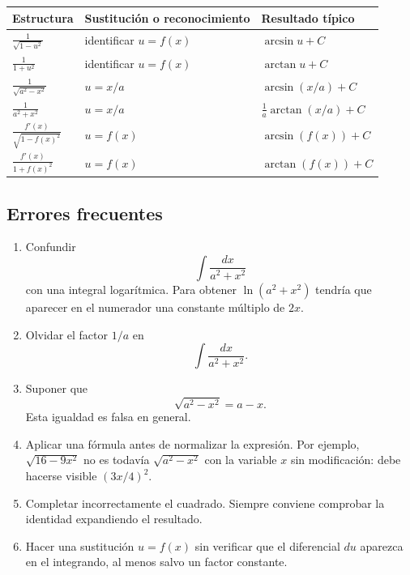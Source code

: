 \begin{center}
\renewcommand{\arraystretch}{1.6}
\begin{tabular}{>{\centering\arraybackslash}p{}
                >{\centering\arraybackslash}p{}
                >{\centering\arraybackslash}p{}}
\toprule
\textbf{Estructura} & \textbf{Sustitución o reconocimiento} & \textbf{Resultado típico}\\
\midrule
$\displaystyle \frac{1}{\sqrt{1-u^2}}$
& identificar $u=f(x)$
& $\arcsin u+C$\\
$\displaystyle \frac{1}{1+u^2}$
& identificar $u=f(x)$
& $\arctan u+C$\\
$\displaystyle \frac{1}{\sqrt{a^2-x^2}}$
& $u=x/a$
& $\arcsin(x/a)+C$\\
$\displaystyle \frac{1}{a^2+x^2}$
& $u=x/a$
& $\frac1a\arctan(x/a)+C$\\
$\displaystyle \frac{f'(x)}{\sqrt{1-f(x)^2}}$
& $u=f(x)$
& $\arcsin(f(x))+C$\\
$\displaystyle \frac{f'(x)}{1+f(x)^2}$
& $u=f(x)$
& $\arctan(f(x))+C$\\
\bottomrule
\end{tabular}
\end{center}

\subsection{Errores frecuentes}

\begin{enumerate}
\item Confundir
\[
\int\frac{dx}{a^2+x^2}
\]
con una integral logarítmica. Para obtener $\ln(a^2+x^2)$ tendría que aparecer
en el numerador una constante múltiplo de $2x$.

\item Olvidar el factor $1/a$ en
\[
\int\frac{dx}{a^2+x^2}.
\]

\item Suponer que
\[
\sqrt{a^2-x^2}=a-x.
\]
Esta igualdad es falsa en general.

\item Aplicar una fórmula antes de normalizar la expresión. Por ejemplo,
$\sqrt{16-9x^2}$ no es todavía $\sqrt{a^2-x^2}$ con la variable $x$ sin
modificación: debe hacerse visible $(3x/4)^2$.

\item Completar incorrectamente el cuadrado. Siempre conviene comprobar la
identidad expandiendo el resultado.

\item Hacer una sustitución $u=f(x)$ sin verificar que el diferencial $du$
aparezca en el integrando, al menos salvo un factor constante.
\end{enumerate}

